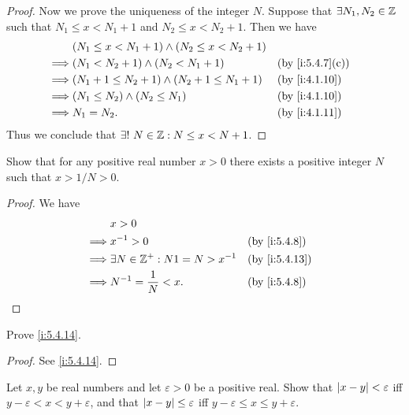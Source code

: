 \begin{proof}
  Now we prove the uniqueness of the integer \(N\).
  Suppose that \(\exists N_1, N_2 \in \mathbb{Z}\) such that \(N_1 \leq x < N_1 + 1\) and \(N_2 \leq x < N_2 + 1\).
  Then we have
  \begin{align*}
             & (N_1 \leq x < N_1 + 1) \land (N_2 \leq x < N_2 + 1)                      \\
    \implies & (N_1 < N_2 + 1) \land (N_2 < N_1 + 1)               &  & \by{i:5.4.7}[c] \\
    \implies & (N_1 + 1 \leq N_2 + 1) \land (N_2 + 1 \leq N_1 + 1) &  & \by{i:4.1.10}   \\
    \implies & (N_1 \leq N_2) \land (N_2 \leq N_1)                 &  & \by{i:4.1.10}   \\
    \implies & N_1 = N_2.                                          &  & \by{i:4.1.11}
  \end{align*}
  Thus we conclude that \(\exists!\ N \in \mathbb{Z} : N \leq x < N + 1\).
\end{proof}

\begin{ex}\label{i:ex:5.4.4}
  Show that for any positive real number \(x > 0\) there exists a positive integer \(N\) such that \(x > 1 / N > 0\).
\end{ex}

\begin{proof}
  We have
  \begin{align*}
             & x > 0                                                   \\
    \implies & x^{-1} > 0                           &  & \by{i:5.4.8}  \\
    \implies & \exists N \in \Z^+ : N1 = N > x^{-1} &  & \by{i:5.4.13} \\
    \implies & N^{-1} = \dfrac{1}{N} < x.           &  & \by{i:5.4.8}
  \end{align*}
\end{proof}

\begin{ex}\label{i:ex:5.4.5}
  Prove \cref{i:5.4.14}.
\end{ex}

\begin{proof}
  See \cref{i:5.4.14}.
\end{proof}

\begin{ex}\label{i:ex:5.4.6}
  Let \(x, y\) be real numbers and let \(\varepsilon > 0\) be a positive real.
  Show that \(\left\lvert x - y\right\rvert < \varepsilon\) iff \(y - \varepsilon < x < y + \varepsilon\), and that \(\left\lvert x - y\right\rvert \leq \varepsilon\) iff \(y - \varepsilon \leq x \leq y + \varepsilon\).
\end{ex}

